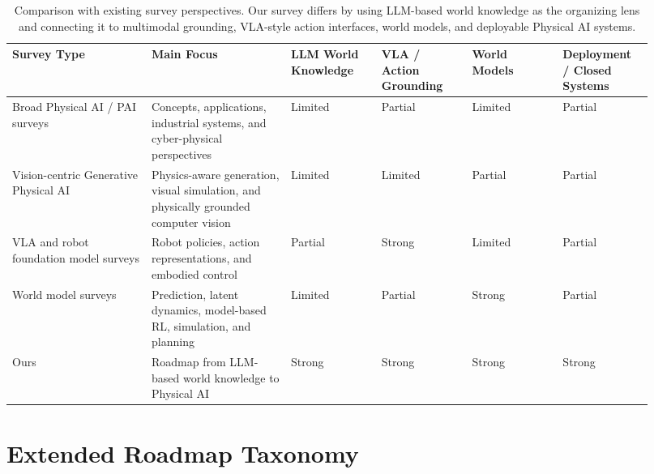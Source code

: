 \begin{table}[t]
\centering
\small
\begin{tabular}{p{0.20\linewidth}p{0.20\linewidth}p{0.13\linewidth}p{0.13\linewidth}p{0.13\linewidth}p{0.13\linewidth}}
\toprule
Survey Type & Main Focus & LLM World Knowledge & VLA / Action Grounding & World Models & Deployment / Closed Systems \\
\midrule
Broad Physical AI / PAI surveys~\citep{li2023physicalai,dewi2025systematicphysicalai}
& Concepts, applications, industrial systems, and cyber-physical perspectives
& Limited
& Partial
& Limited
& Partial \\
\midrule
Vision-centric Generative Physical AI~\citep{liu2025generative}
& Physics-aware generation, visual simulation, and physically grounded computer vision
& Limited
& Limited
& Partial
& Partial \\
\midrule
VLA and robot foundation model surveys
& Robot policies, action representations, and embodied control
& Partial
& Strong
& Limited
& Partial \\
\midrule
World model surveys
& Prediction, latent dynamics, model-based RL, simulation, and planning
& Limited
& Partial
& Strong
& Partial \\
\midrule
Ours
& Roadmap from LLM-based world knowledge to Physical AI
& Strong
& Strong
& Strong
& Strong \\
\bottomrule
\end{tabular}
\caption{Comparison with existing survey perspectives. Our survey differs by using LLM-based world knowledge as the organizing lens and connecting it to multimodal grounding, VLA-style action interfaces, world models, and deployable Physical AI systems.}
\label{tab:survey-comparison}
\end{table}

\section{Extended Roadmap Taxonomy}
\label{app:roadmap-taxonomy}

